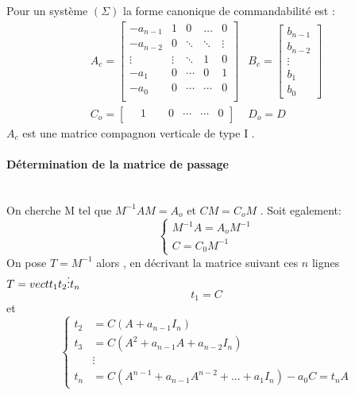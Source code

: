 \documentclass[main.tex]{subfiles}
\begin{document}
\begin{defin}
  Pour un système $(\Sigma)$ la forme canonique de commandabilité est :
\[  \begin{array}{ll}
    A_c =
    \begin{bmatrix}
      -a_{n-1} & 1 & 0 & \dots & 0 \\
      -a_{n-2} & 0 & \ddots &\ddots &\vdots \\
      \vdots        & \vdots  & \ddots & 1& 0 \\
      -a_{1} & 0 & \cdots  &0 &1 \\
      -a_0 & 0 & \cdots & \cdots & 0 \\
    \end{bmatrix}
&  B_c =
    \begin{bmatrix}
      b_{n-1} \\
      b_{n-2} \\
      \vdots \\
      b_{1} \\
      b_{0}
    \end{bmatrix}  \\
C_o =
    \begin{bmatrix}
     \quad1_{~}&\quad0& \cdots &  \cdots &  0
    \end{bmatrix} &
D_o = D
    \end{array}
  \]
  $A_c$ est une matrice compagnon verticale de type I .

\end{defin}

\paragraph{Détermination de la matrice de passage}~\\
On cherche M tel que $M^{-1}AM = A_o $ et $ CM = C_oM$ . Soit egalement:
\[
  \begin{cases}
    M^{-1}A = A_oM^{-1}\\
    C = C_0M^{-1}
  \end{cases}
\]
On pose $T=M^{-1}$ alors , en décrivant la matrice suivant ces $n$ lignes
$T= vect{t_1 \\ t_2 \\ \vdots \\ t_n\\ }$
\[
t_1 = C
\]
et
\[
  \begin{cases}
    t_2 &= C(A+a_{n-1}I_n) \\
    t_3 &= C(A^2+a_{n-1}A +a_{n-2}I_n) \\
&\vdots\\
      t_{n}  &= C(A^{n-1}+a_{n-1}A^{n-2}+ ... + a_1 I_n)
      -a_0 C =t_nA
    \end{cases}
\]
\end{document}
